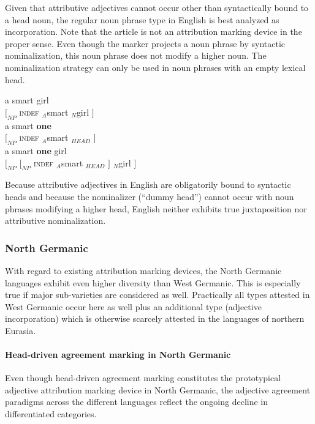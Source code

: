 Given that attributive adjectives cannot occur other than syntactically bound to a head noun, the regular noun phrase type in English is best analyzed as incorporation. Note that the article is not an attribution marking device in the proper sense. Even though the marker projects a noun phrase by syntactic nominalization, this noun phrase does not modify a higher noun. The nominalization strategy can only be used in noun phrases with an empty lexical head.
\begin{exe}
\ex
\begin{xlist}
\ex
\gll	{} a smart girl\\
	$[_{NP}$ \textsc{indef} $_{A}$smart $_{N}$girl $]$\\
\ex
\gll	{} a smart \textbf{one}\\
	$[_{NP}$ \textsc{indef} $_{A}$smart $_{HEAD}$ $]$\\
\ex
\gll	{*} {} {} a smart \textbf{one} {} girl\\
	{} $[_{NP}$  $[_{NP}$ \textsc{indef} $_{A}$smart $_{HEAD}$ $]$ $_{N}$girl $]$\\
\end{xlist}
\end{exe}
Because attributive adjectives in English are obligatorily bound to syntactic heads and because the nominalizer (“dummy head”) cannot occur with noun phrases modifying a higher head, English neither exhibits true juxtaposition nor attributive nominalization.

\subsubsection{North Germanic} \label{n-germanic synchr}
With regard to existing attribution marking devices, the North Germanic languages exhibit even higher diversity than West Germanic. This is especially true if major sub-varieties are considered as well. Practically all types attested in West Germanic occur here as well plus an additional type (adjective incorporation) which is otherwise scarcely attested in the languages of northern Eurasia.

\paragraph{Head-driven agreement marking in North Germanic} Even though head-driven agreement marking constitutes the prototypical adjective attribution marking device in North Germanic, the adjective agreement paradigms across the different languages reflect the ongoing decline in differentiated categories.

